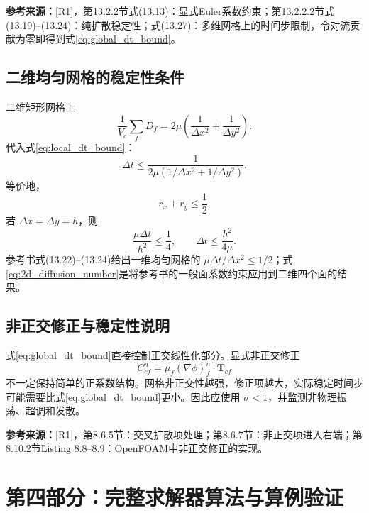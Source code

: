 \documentclass[UTF8,12pt,a4paper]{ctexart}
\numberwithin{equation}{section}
\newcommand{\Rone}{\textnormal{[R1]}}
\newcommand{\source}[1]{%
  \par\smallskip
  \noindent\colorbox{sourcebg}{%
    \parbox{0.955\linewidth}{\raggedright\footnotesize\color{sourcegray}\textbf{参考来源：}#1}%
  }
  \par\smallskip
}
\newcommand{\Tf}{\bm T}
\begin{document}
\source{\Rone，第13.2.2节式(13.13)：显式Euler系数约束；第13.2.2.2节式(13.19)--(13.24)：纯扩散稳定性；式(13.27)：多维网格上的时间步限制，令对流贡献为零即得到式\eqref{eq:global_dt_bound}。}

\subsection{二维均匀网格的稳定性条件}

二维矩形网格上
\begin{equation}
  \frac{1}{V_c}\sum_fD_f
  =2\mu\left(\frac{1}{\Delta x^2}+\frac{1}{\Delta y^2}\right).
  \label{eq:rect_sum_D}
\end{equation}
代入式\eqref{eq:local_dt_bound}：
\begin{equation}
  \boxed{
  \Delta t\leq
  \frac{1}{2\mu(1/\Delta x^2+1/\Delta y^2)}}.
  \label{eq:2d_dt_bound}
\end{equation}
等价地，
\begin{equation}
  \boxed{r_x+r_y\leq\frac12}.
  \label{eq:2d_diffusion_number}
\end{equation}
若 $\Delta x=\Delta y=h$，则
\begin{equation}
  \boxed{
  \frac{\mu\Delta t}{h^2}\leq\frac14,
  \qquad
  \Delta t\leq\frac{h^2}{4\mu}}.
  \label{eq:square_dt_bound}
\end{equation}
参考书式(13.22)--(13.24)给出一维均匀网格的 $\mu\Delta t/\Delta x^2\leq1/2$；式\eqref{eq:2d_diffusion_number}是将参考书的一般面系数约束应用到二维四个面的结果。

\subsection{非正交修正与稳定性说明}

式\eqref{eq:global_dt_bound}直接控制正交线性化部分。显式非正交修正
\begin{equation}
  C_{cf}^n=\mu_f(\nabla\phi)_f^n\cdot\Tf_{cf}
\end{equation}
不一定保持简单的正系数结构。网格非正交性越强，修正项越大，实际稳定时间步可能需要比式\eqref{eq:global_dt_bound}更小。因此应使用 $\sigma<1$，并监测非物理振荡、超调和发散。

\source{\Rone，第8.6.5节：交叉扩散项处理；第8.6.7节：非正交项进入右端；第8.10.2节Listing 8.8--8.9：OpenFOAM中非正交修正的实现。}

\newpage
\section{第四部分：完整求解器算法与算例验证}
\end{document}
